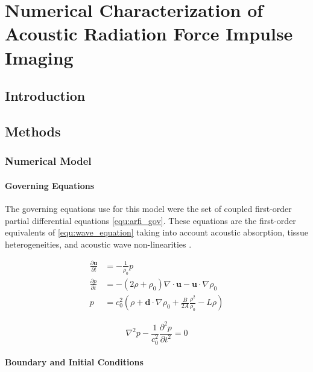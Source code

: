 \chapter{Numerical Characterization of Acoustic Radiation Force Impulse Imaging}
	\label{chap:arfi}
	\section{Introduction}
	\section{Methods}
		\subsection{Numerical Model}
			\subsubsection{Governing Equations}
				The governing equations use for this model were the set of coupled first-order partial differential equations \ref{equ:arfi_gov}. These equations are the first-order equivalents of \ref{equ:wave_equation} taking into account acoustic absorption, tissue heterogeneities, and acoustic wave non-linearities \cite{treeby12}.

				\begin{subequations}
					\label{equ:arfi_gov}
					\begin{align}
						\frac{\partial \mathbf{u}}{\partial t} &= - \frac{1}{\rho_0} p \label{equ:arfi_gov_p1} \\
						\frac{\partial p}{\partial t} &= -\left(2 \rho + \rho_0\right)\nabla \cdot \mathbf{u} - \mathbf{u} \cdot \nabla \rho_0 \label{equ:arfi_gov_p2} \\
						p &= c_0^2 \left(\rho + \mathbf{d} \cdot \nabla \rho_0 + \frac{B}{2A} \frac{\rho^2}{\rho_0} - L\rho \right) \label{equ:arfi_gov_p3}
					\end{align}
				\end{subequations}

				\begin{equation}
					\label{equ:wave_equation}
					\nabla^2 p - \frac{1}{c_0^2}\frac{\partial^2 p}{\partial t^2} = 0
				\end{equation}

			\subsubsection{Boundary and Initial Conditions}
